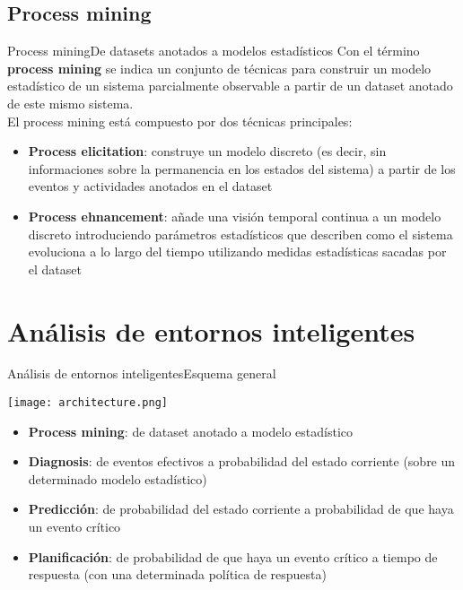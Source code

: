 \documentclass[9pt, handout]{beamer}
\begin{document}
    \subsection{Process mining}
      \begin{frame}{Process mining}{De datasets anotados a modelos estadísticos}
        Con el término \textbf{process mining} se indica un conjunto de técnicas para construir un modelo estadístico de un sistema parcialmente observable a partir de un dataset anotado de este mismo sistema.\\[1em]
        
        El process mining está compuesto por dos técnicas principales:
        \begin{itemize}
          \item \textbf{Process elicitation}: construye un modelo discreto (es decir, sin informaciones sobre la permanencia en los estados del sistema) a partir de los eventos y actividades anotados en el dataset
          \item \textbf{Process ehnancement}: añade una visión temporal continua a un modelo discreto introduciendo parámetros estadísticos que describen como el sistema evoluciona a lo largo del tiempo utilizando medidas estadísticas sacadas por el dataset
        \end{itemize}
      \end{frame}
    
  \section{Análisis de entornos inteligentes}
  
    \begin{frame}{Análisis de entornos inteligentes}{Esquema general}
      \begin{center}
        \texttt{[image: architecture.png]}
      \end{center}
      
      \begin{itemize}
        \item \textbf{Process mining}: de dataset anotado a modelo estadístico
        \item \textbf{Diagnosis}: de eventos efectivos a probabilidad del estado corriente (sobre un determinado modelo estadístico)
        \item \textbf{Predicción}: de probabilidad del estado corriente a probabilidad de que haya un evento crítico
        \item \textbf{Planificación}: de probabilidad de que haya un evento crítico a tiempo de respuesta (con una determinada política de respuesta)
      \end{itemize}
    \end{frame}
  
\end{document}
